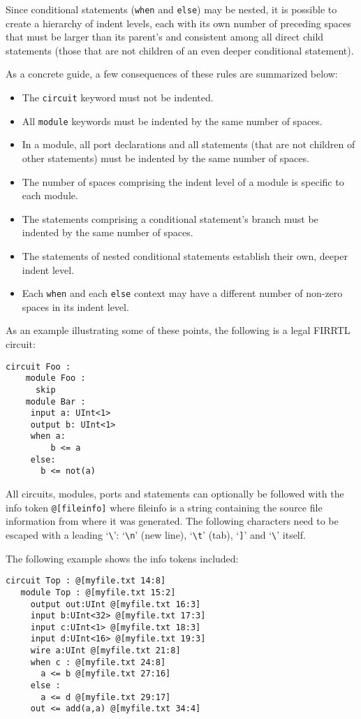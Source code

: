 \documentclass[12pt]{article}
\begin{document}
Since conditional statements (\verb|when| and \verb|else|) may be nested, it is possible to create a hierarchy of indent levels, each with its own number of preceding spaces that must be larger than its parent’s and consistent among all direct child statements (those that are not children of an even deeper conditional statement).

As a concrete guide, a few consequences of these rules are summarized below:

\begin{itemize}
\item The \verb|circuit| keyword must not be indented.
\item All \verb|module| keywords must be indented by the same number of spaces.
\item In a module, all port declarations and all statements (that are not children of other statements) must be indented by the same number of spaces.
\item The number of spaces comprising the indent level of a module is specific to each module.
\item The statements comprising a conditional statement's branch must be indented by the same number of spaces.
\item The statements of nested conditional statements establish their own, deeper indent level.
\item Each \verb|when| and each \verb|else| context may have a different number of non-zero spaces in its indent level.
\end{itemize}

As an example illustrating some of these points, the following is a legal FIRRTL circuit:

\begin{lstlisting}
circuit Foo :
    module Foo :
      skip
    module Bar :
     input a: UInt<1>
     output b: UInt<1>
     when a:
         b <= a
     else:
       b <= not(a)
\end{lstlisting}

All circuits, modules, ports and statements can optionally be followed with the info token \verb|@[fileinfo]|
where fileinfo is a string containing the source file information from where it was generated.
The following characters need to be escaped with a leading `\verb|\|':
`\verb|\n|' (new line), `\verb|\t|' (tab), `\verb|]|' and `\verb|\|' itself.

The following example shows the info tokens included:

\begin{lstlisting}
circuit Top : @[myfile.txt 14:8]
   module Top : @[myfile.txt 15:2]
     output out:UInt @[myfile.txt 16:3]
     input b:UInt<32> @[myfile.txt 17:3]
     input c:UInt<1> @[myfile.txt 18:3]
     input d:UInt<16> @[myfile.txt 19:3]
     wire a:UInt @[myfile.txt 21:8]
     when c : @[myfile.txt 24:8]
       a <= b @[myfile.txt 27:16]
     else :
       a <= d @[myfile.txt 29:17]
     out <= add(a,a) @[myfile.txt 34:4]
\end{lstlisting}
\end{document}
